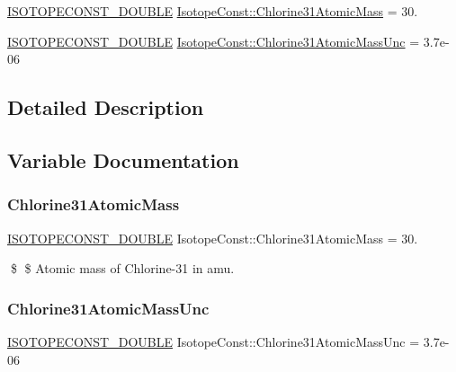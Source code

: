 \begin{DoxyCompactItemize}
\item 
\mbox{\hyperlink{group___isotope_const-_macros_ga8f45a7272ce02c0b4c65c44636ed719a}{I\+S\+O\+T\+O\+P\+E\+C\+O\+N\+S\+T\+\_\+\+D\+O\+U\+B\+LE}} \mbox{\hyperlink{group___isotope_const-_chlorine-_cl31_ga6e4a7caf0c877ccad6b0a9325d6da854}{Isotope\+Const\+::\+Chlorine31\+Atomic\+Mass}} = 30.
\item 
\mbox{\hyperlink{group___isotope_const-_macros_ga8f45a7272ce02c0b4c65c44636ed719a}{I\+S\+O\+T\+O\+P\+E\+C\+O\+N\+S\+T\+\_\+\+D\+O\+U\+B\+LE}} \mbox{\hyperlink{group___isotope_const-_chlorine-_cl31_ga30e9e261b6dacb4dca59eb810b0e6a8e}{Isotope\+Const\+::\+Chlorine31\+Atomic\+Mass\+Unc}} = 3.\+7e-\/06
\end{DoxyCompactItemize}


\subsection{Detailed Description}


\subsection{Variable Documentation}
\mbox{\label{group___isotope_const-_chlorine-_cl31_ga6e4a7caf0c877ccad6b0a9325d6da854}} 
\subsubsection{\texorpdfstring{Chlorine31\+Atomic\+Mass}{Chlorine31AtomicMass}}
{\footnotesize\ttfamily \mbox{\hyperlink{group___isotope_const-_macros_ga8f45a7272ce02c0b4c65c44636ed719a}{I\+S\+O\+T\+O\+P\+E\+C\+O\+N\+S\+T\+\_\+\+D\+O\+U\+B\+LE}} Isotope\+Const\+::\+Chlorine31\+Atomic\+Mass = 30.}

\$ \$ Atomic mass of Chlorine-\/31 in amu. \mbox{\label{group___isotope_const-_chlorine-_cl31_ga30e9e261b6dacb4dca59eb810b0e6a8e}} 
\subsubsection{\texorpdfstring{Chlorine31\+Atomic\+Mass\+Unc}{Chlorine31AtomicMassUnc}}
{\footnotesize\ttfamily \mbox{\hyperlink{group___isotope_const-_macros_ga8f45a7272ce02c0b4c65c44636ed719a}{I\+S\+O\+T\+O\+P\+E\+C\+O\+N\+S\+T\+\_\+\+D\+O\+U\+B\+LE}} Isotope\+Const\+::\+Chlorine31\+Atomic\+Mass\+Unc = 3.\+7e-\/06}

